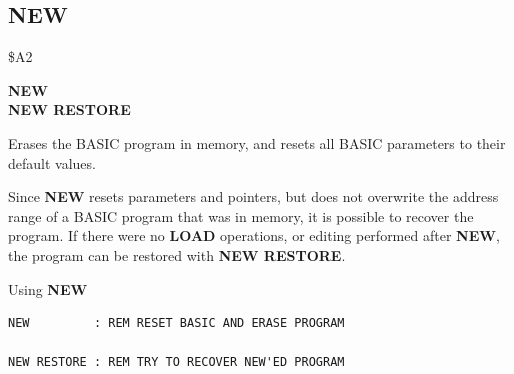 
\newpage
\subsection{NEW}
\begin{description}[leftmargin=2cm,style=nextline]
\item [Token:]    \$A2

\item [Format:]   {\bf NEW} \\
                  {\bf NEW RESTORE}

\item [Usage:]    Erases the BASIC program in memory, and resets all BASIC parameters to their default values.

                  Since {\bf NEW} resets parameters and pointers, but does not overwrite the address range of a BASIC program that was in memory, it is possible to recover the program. If there were no {\bf LOAD} operations, or editing performed after {\bf NEW}, the program can be restored with {\bf NEW RESTORE}.

\item [Examples:] Using {\bf NEW}

\begin{tcolorbox}[colback=black,coltext=white]
\verbatimfont{\codefont}
\begin{verbatim}
NEW         : REM RESET BASIC AND ERASE PROGRAM

NEW RESTORE : REM TRY TO RECOVER NEW'ED PROGRAM
\end{verbatim}
\end{tcolorbox}
\end{description}


\newpage
